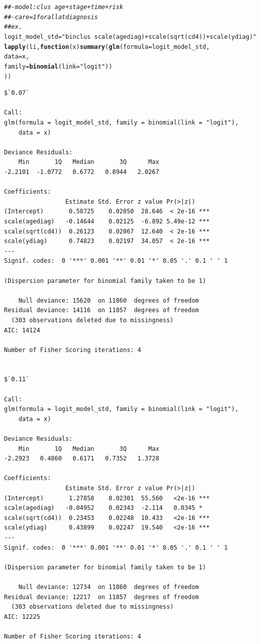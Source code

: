 \documentclass[]{revtex4}\usepackage[]{graphicx}\usepackage[]{color}
\makeatletter
\newcommand{\hlstr}[1]{\textcolor[rgb]{0.192,0.494,0.8}{#1}}%
\newcommand{\hlcom}[1]{\textcolor[rgb]{0.678,0.584,0.686}{\textit{#1}}}%
\newcommand{\hlstd}[1]{\textcolor[rgb]{0.345,0.345,0.345}{#1}}%
\newcommand{\hlkwa}[1]{\textcolor[rgb]{0.161,0.373,0.58}{\textbf{#1}}}%
\newcommand{\hlkwb}[1]{\textcolor[rgb]{0.69,0.353,0.396}{#1}}%
\newcommand{\hlkwc}[1]{\textcolor[rgb]{0.333,0.667,0.333}{#1}}%
\newcommand{\hlkwd}[1]{\textcolor[rgb]{0.737,0.353,0.396}{\textbf{#1}}}%
\newenvironment{kframe}{%
 \def\at@end@of@kframe{}%
 \ifinner\ifhmode%
  \def\at@end@of@kframe{\end{minipage}}%
  \begin{minipage}{\columnwidth}%
 \fi\fi%
 \def\FrameCommand##1{\hskip\@totalleftmargin \hskip-\fboxsep
 \colorbox{shadecolor}{##1}\hskip-\fboxsep
     \hskip-\linewidth \hskip-\@totalleftmargin \hskip\columnwidth}%
 \MakeFramed {\advance\hsize-\width
   \@totalleftmargin\z@ \linewidth\hsize
   \@setminipage}}%
 {\par\unskip\endMakeFramed%
 \at@end@of@kframe}
\newenvironment{knitrout}{}{} %
\makeatother
\begin{document}
\begin{knitrout}
\color{fgcolor}\begin{kframe}
\begin{alltt}
\hlcom{##- model: clus ~ age +  stage + time + risk}
\hlcom{##- care = 1 for all at diagnosis}
\hlcom{## ex. }
\hlstd{logit_model_std} \hlkwb{=} \hlstr{"binclus ~ scale(agediag) + scale(sqrt(cd4)) + scale(ydiag)"}
\hlkwd{lapply}\hlstd{(li,} \hlkwa{function}\hlstd{(}\hlkwc{x}\hlstd{)} \hlkwd{summary}\hlstd{(}\hlkwd{glm}\hlstd{(}\hlkwc{formula} \hlstd{= logit_model_std,}
                                     \hlkwc{data} \hlstd{= x,}
                                     \hlkwc{family} \hlstd{=} \hlkwd{binomial}\hlstd{(}\hlkwc{link} \hlstd{=} \hlstr{"logit"}\hlstd{))}
                               \hlstd{))}
\end{alltt}
\begin{verbatim}
$`0.07`

Call:
glm(formula = logit_model_std, family = binomial(link = "logit"), 
    data = x)

Deviance Residuals: 
    Min       1Q   Median       3Q      Max  
-2.2101  -1.0772   0.6772   0.8944   2.0267  

Coefficients:
                 Estimate Std. Error z value Pr(>|z|)    
(Intercept)       0.58725    0.02050  28.646  < 2e-16 ***
scale(agediag)   -0.14644    0.02125  -6.892 5.49e-12 ***
scale(sqrt(cd4))  0.26123    0.02067  12.640  < 2e-16 ***
scale(ydiag)      0.74823    0.02197  34.057  < 2e-16 ***
---
Signif. codes:  0 '***' 0.001 '**' 0.01 '*' 0.05 '.' 0.1 ' ' 1

(Dispersion parameter for binomial family taken to be 1)

    Null deviance: 15620  on 11860  degrees of freedom
Residual deviance: 14116  on 11857  degrees of freedom
  (303 observations deleted due to missingness)
AIC: 14124

Number of Fisher Scoring iterations: 4


$`0.11`

Call:
glm(formula = logit_model_std, family = binomial(link = "logit"), 
    data = x)

Deviance Residuals: 
    Min       1Q   Median       3Q      Max  
-2.2923   0.4860   0.6171   0.7352   1.3728  

Coefficients:
                 Estimate Std. Error z value Pr(>|z|)    
(Intercept)       1.27858    0.02301  55.560   <2e-16 ***
scale(agediag)   -0.04952    0.02343  -2.114   0.0345 *  
scale(sqrt(cd4))  0.23453    0.02248  10.433   <2e-16 ***
scale(ydiag)      0.43899    0.02247  19.540   <2e-16 ***
---
Signif. codes:  0 '***' 0.001 '**' 0.01 '*' 0.05 '.' 0.1 ' ' 1

(Dispersion parameter for binomial family taken to be 1)

    Null deviance: 12734  on 11860  degrees of freedom
Residual deviance: 12217  on 11857  degrees of freedom
  (303 observations deleted due to missingness)
AIC: 12225

Number of Fisher Scoring iterations: 4
\end{verbatim}
\end{kframe}
\end{knitrout}
\end{document}

